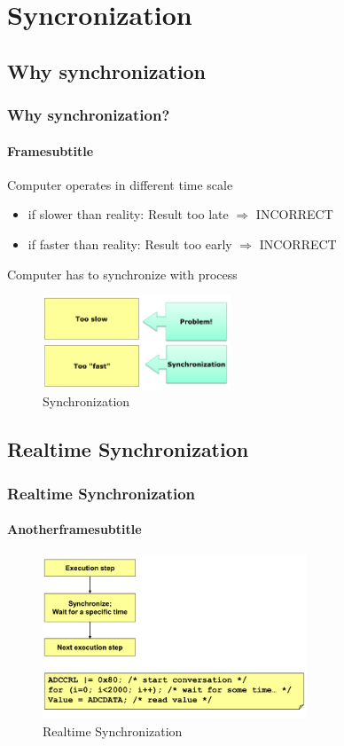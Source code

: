 \section{Syncronization}
\subsection{Why synchronization}
\begin{frame}
    \frametitle{Why synchronization?}
    \framesubtitle{Framesubtitle}
    Computer operates in different time scale
    \begin{itemize}
        \item if slower than reality: Result too late $\Rightarrow$ INCORRECT
        \item if faster than reality: Result too early $\Rightarrow$ INCORRECT
    \end{itemize}
    Computer has to synchronize with process
    \begin{figure}
        \includegraphics[width=0.5\textwidth]{fig/synchronization.png}
        \caption{Synchronization}
    \end{figure}
\end{frame}

\subsection{Realtime Synchronization}
\begin{frame}
    \frametitle{Realtime Synchronization}
    \framesubtitle{Anotherframesubtitle}
    \begin{figure}
        \includegraphics[width=0.7\textwidth]{fig/realtime.png}
        \caption{Realtime Synchronization}
    \end{figure}
\end{frame}

